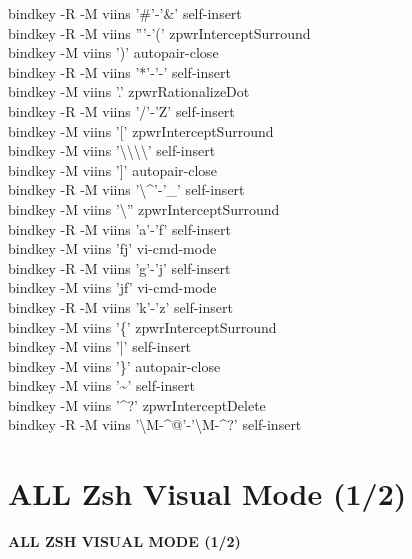 \documentclass[11pt,a4paper,twoside]{book}
\begin{document}
bindkey -R -M viins '\#'-'\&' self-insert\\
bindkey -R -M viins '''-'(' zpwrInterceptSurround\\
bindkey -M viins ')' autopair-close\\
bindkey -R -M viins '*'-'-' self-insert\\
bindkey -M viins '.' zpwrRationalizeDot\\
bindkey -R -M viins '/'-'Z' self-insert\\
bindkey -M viins '[' zpwrInterceptSurround\\
bindkey -M viins '\textbackslash{}\textbackslash{}\textbackslash{}\textbackslash{}' self-insert\\
bindkey -M viins ']' autopair-close\\
bindkey -R -M viins '\textbackslash{}\textasciicircum{}'-'\_' self-insert\\
bindkey -M viins '\textbackslash{}'' zpwrInterceptSurround\\
bindkey -R -M viins 'a'-'f' self-insert\\
bindkey -M viins 'fj' vi-cmd-mode\\
bindkey -R -M viins 'g'-'j' self-insert\\
bindkey -M viins 'jf' vi-cmd-mode\\
bindkey -R -M viins 'k'-'z' self-insert\\
bindkey -M viins '\{' zpwrInterceptSurround\\
bindkey -M viins '|' self-insert\\
bindkey -M viins '\}' autopair-close\\
bindkey -M viins '\textasciitilde{}' self-insert\\
bindkey -M viins '\textasciicircum{}?' zpwrInterceptDelete\\
bindkey -R -M viins '\textbackslash{}M-\textasciicircum{}@'-'\textbackslash{}M-\textasciicircum{}?' self-insert\\


\vspace{16pt}

\section{ALL Zsh Visual Mode (1/2)}


\vspace{10pt}
{\large\bfseries\color{neoncyan} ALL ZSH VISUAL MODE (1/2)}\vspace{6pt}
\end{document}
